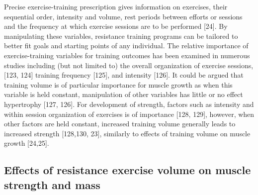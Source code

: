 \documentclass[twoside,10pt]{gihclass} %
\begin{document}
Precise exercise-training prescription gives information on exercises, their sequential order, intensity and volume, rest periods between efforts or sessions and the frequency at which exercise sessions are to be performed
{[}24{]}.
By manipulating these variables, resistance training programs can be tailored to better fit goals and starting points of any individual.
The relative importance of exercise-training variables for training outcomes has been examined in numerous studies including (but not limited to) the overall organization of exercise sessions,
{[}123, 124{]}
training frequency
{[}125{]},
and intensity
{[}126{]}.
It could be argued that training volume is of particular importance for muscle growth as when this variable is held constant, manipulation of other variables has little or no effect hypertrophy
{[}127, 126{]}.
For development of strength, factors such as intensity and within session organization of exercises is of importance
{[}128, 129{]},
however, when other factors are held constant, increased training volume generally leads to increased strength
{[}128,130, 23{]},
similarly to effects of training volume on muscle growth
{[}24,25{]}.

\hypertarget{effects-of-resistance-exercise-volume-on-muscle-strength-and-mass}{%
\subsection{Effects of resistance exercise volume on muscle strength and mass}\label{effects-of-resistance-exercise-volume-on-muscle-strength-and-mass}}
\end{document}
